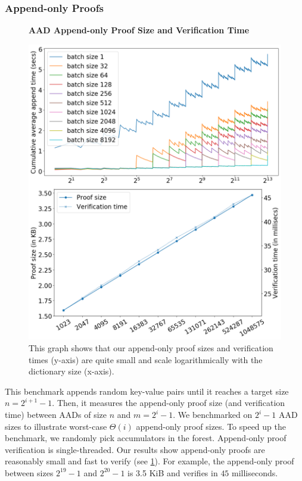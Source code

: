 \subsubsection{Append-only Proofs}
\label{s:eval:append-only-proof}

\begin{figure}[t]
    \centering
    \textbf{AAD Append-only Proof Size and Verification Time}\par\medskip
    \includegraphics[width=.70\columnwidth,trim={0 0 0 23cm},clip]{figures-aad/aad-merged-append-time-and-proof.png}
    \caption{
        This graph shows that our append-only proof sizes and verification times (y-axis) are quite small and scale logarithmically with the dictionary size (x-axis).
    }
    \label{f:append-only-proof}
\end{figure}

This benchmark appends random key-value pairs until it reaches a target size $n = 2^{i+1} - 1$.
Then, it measures the append-only proof size (and verification time) between AADs of size $n$ and $m = 2^{i} - 1$.
We benchmarked on $2^{i}-1$ AAD sizes to illustrate worst-case $\Theta(i)$ append-only proof sizes.
To speed up the benchmark, we randomly pick accumulators in the forest.
Append-only proof verification is single-threaded.
Our results show append-only proofs are reasonably small and fast to verify (see \cref{f:append-only-proof}).
For example, the append-only proof between sizes $2^{19}-1$ and $2^{20}-1$ is 3.5 KiB and verifies in $45$ milliseconds.

